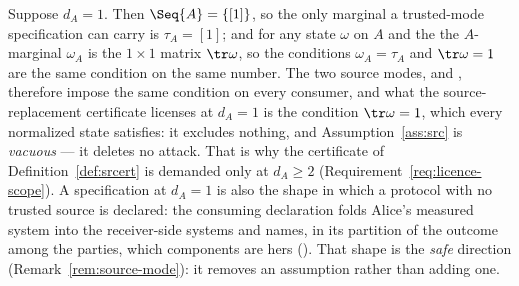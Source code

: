 \begin{remark}
\label{rem:da1}
Suppose $d_A=1$. Then $\Seq{A}=\{[1]\}$, so the only marginal a
trusted-mode specification can carry is $\tau_A=[1]$; and for any state
$\omega$ on $A$ and the  the $A$-marginal $\omega_A$ is
the $1\times1$ matrix $\tr\omega$, so the conditions $\omega_A=\tau_A$ and
$\tr\omega=1$ are the same condition on the same number. The two source
modes,  and , therefore impose the same
condition on every consumer, and what the source-replacement certificate
licenses at $d_A=1$ is the condition $\tr\omega=1$, which every normalized
state satisfies: it excludes nothing, and Assumption~\ref{ass:src} is
\emph{vacuous} --- it deletes no attack. That is why the certificate of
Definition~\ref{def:srcert} is demanded only at $d_A\ge2$
(Requirement~\ref{req:licence-scope}). A specification at $d_A=1$ is also
the shape in which a protocol with no trusted source is declared: the
consuming declaration folds Alice's measured system into the receiver-side
systems and names, in its partition of the outcome among the parties, which
components are hers (). That shape is the
\emph{safe} direction (Remark~\ref{rem:source-mode}): it removes an assumption
rather than adding one.


\end{remark}
